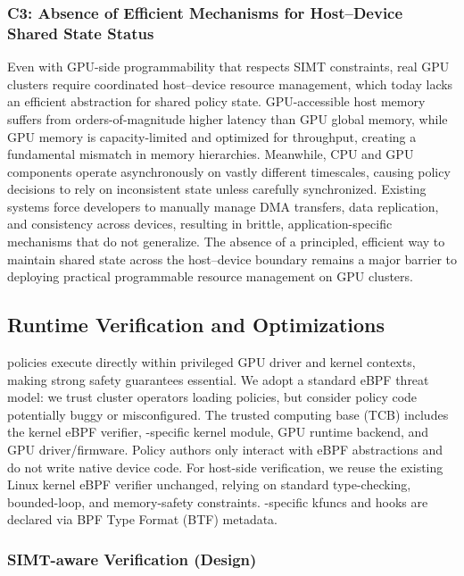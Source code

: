 \subsubsection{C3: Absence of Efficient Mechanisms for Host–Device Shared State Status}

Even with GPU-side programmability that respects SIMT constraints, real GPU clusters require coordinated host–device resource management, which today lacks an efficient abstraction for shared policy state. 
GPU-accessible host memory suffers from orders-of-magnitude higher latency than GPU global memory, while GPU memory is capacity-limited and optimized for throughput, creating a fundamental mismatch in memory hierarchies. 
Meanwhile, CPU and GPU components operate asynchronously on vastly different timescales, causing policy decisions to rely on inconsistent state unless carefully synchronized. 
Existing systems force developers to manually manage DMA transfers, data replication, and consistency across devices, resulting in brittle, application-specific mechanisms that do not generalize.
The absence of a principled, efficient way to maintain shared state across the host–device boundary remains a major barrier to deploying practical programmable resource management on GPU clusters.

\subsection{Runtime Verification and Optimizations}
\label{sec:verification}

\sys policies execute directly within privileged GPU driver and kernel contexts, making strong safety guarantees essential. We adopt a standard eBPF threat model: we trust cluster operators loading policies, but consider policy code potentially buggy or misconfigured. The trusted computing base (TCB) includes the kernel eBPF verifier, \sys-specific kernel module, GPU runtime backend, and GPU driver/firmware. Policy authors only interact with eBPF abstractions and do not write native device code. For host-side verification, we reuse the existing Linux kernel eBPF verifier unchanged, relying on standard type-checking, bounded-loop, and memory-safety constraints. \sys-specific kfuncs and hooks are declared via BPF Type Format (BTF) metadata.

\subsubsection{SIMT-aware Verification (Design)}

